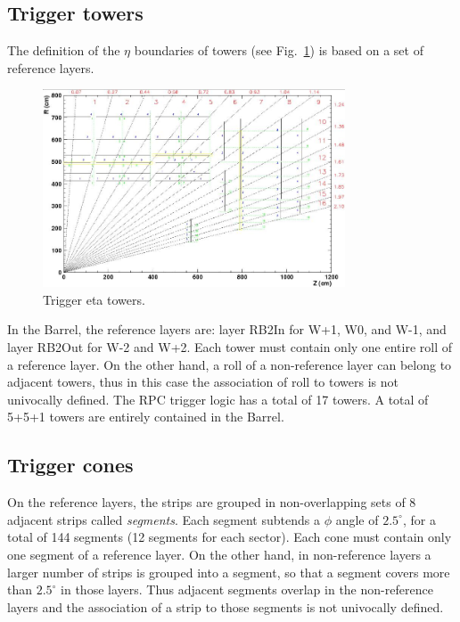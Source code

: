 \subsection{Trigger towers}
The definition of the $\eta$ boundaries 
of towers (see Fig.~\ref{fig:eta_towers}) is based on a set 
of reference layers.

\begin{figure}[hbtp]
  \begin{center}
    \includegraphics[width=0.8\textwidth]{eta_towers}
    \hspace{1cm}
    \caption{Trigger eta towers.}
    \label{fig:eta_towers}
  \end{center}
\end{figure}

In the Barrel, the reference layers are:
layer RB2In for W+1, W0, and W-1, 
and layer RB2Out for W-2 and W+2. 
Each tower must contain only one entire roll 
of a reference layer. On the 
other hand, a roll of a non-reference layer
can belong to adjacent towers, thus in this case 
the association of roll to towers is not univocally defined. 
The RPC trigger logic has a total of 17 towers.
A total of 5+5+1 towers are entirely contained in the Barrel.



\subsection{Trigger cones}
On the reference layers, the strips are grouped in
non-overlapping sets of 8 adjacent strips called {\em segments}.
Each segment subtends a $\phi$ angle of $2.5^\circ$, for a total 
of 144 segments (12 segments for each sector).
Each cone must contain only one segment of a reference 
layer.
On the other hand, in non-reference layers a larger number
of strips is grouped into a segment, so that a segment
covers more than $2.5^\circ$ in those layers.
Thus adjacent segments overlap in the non-reference layers and 
the association of a strip to those segments is not univocally defined.

